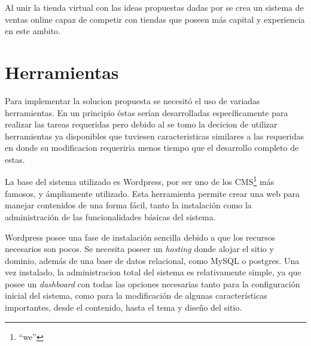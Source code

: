 Al unir la tienda virtual con las ideas propuestas dadas por {\GAM} se crea un
sistema de ventas online capaz de competir con tiendas que poseen más capital
y experiencia en este ambito.

\section{Herramientas}

Para implementar la solucion propuesta se necesitó el uso de variadas herramientas.
En un principio éstas serían desarrolladas específicamente para realizar las
tareas requeridas pero debido al 
se tomo la decicion
de utilizar herramientas ya disponibles que tuviesen caracteristicas similares a
las requeridas en donde su modificacion requeriria menos tiempo que el desarrollo
completo de estas.

La base del sistema utilizado es Wordpress,
por ser uno de los CMS\footnote{``we'' } más famosos,
y ámpliamente utilizado.
Esta herramienta permite crear una web para manejar contenidos
de una forma fácil, tanto la instalación como la administración de las
funcionalidades básicas del sistema.

Wordpress posee una fase de instalación sencilla debido a que los recursos
necesarios son pocos.
Se necesita poseer un \emph{hosting} donde alojar el sitio y dominio,
además de una base de datos relacional, como MySQL o postgres.
Una vez instalado, la administracion total del sistema es relativamente simple,
ya que posee un \emph{dashboard} con todas las opciones necesarias
tanto para la configuración inicial del sistema, como para la modificación
de algunas características importantes, desde el contenido, hasta el tema
y diseño del sitio.

